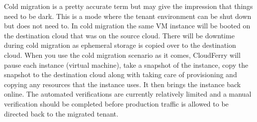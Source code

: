 \documentclass{article}
\begin{document}
\vspace{2pt}
{\color{color03} Cold migration is a pretty accurate term but may give the impression 
that things need to be dark. This is a mode where the tenant environment can be 
shut down but does not need to. In cold migration the same VM instance will be 
booted on the destination cloud that was on the source cloud. There will be downtime 
during cold migration as ephemeral storage is copied over to the destination cloud. 
When you use the cold migration scenario as it comes,\label{HGoBack} CloudFerry 
will pause each instance (virtual machine), take a snapshot of the instance, copy 
the snapshot to the destination cloud along with taking care of provisioning and 
copying any resources that the instance uses. It then brings the instance back 
online. The automated verifications are currently relatively limited and a manual 
verification should be completed before production traffic is allowed to be directed 
back to the migrated tenant.}

\newpage
\end{document}
